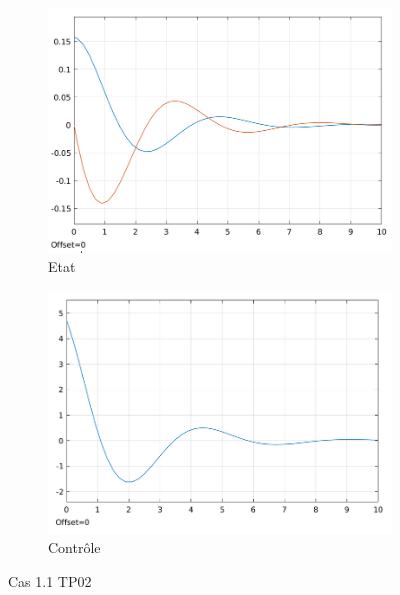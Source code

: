 \documentclass[a4paper]{article}
\begin{document}
                        \begin{figure}[h!]
                                \centering
                                \begin{subfigure}[b]{0.45\textwidth}
                                        \includegraphics[width=\textwidth]{images/courbe_cas_1_1_TP02.png}
                                        \caption{Etat}
                                        \label{fig_cas_1.1_TP02_etats}
                                \end{subfigure}
                                \hspace{30pt}
                                \begin{subfigure}[b]{0.45\textwidth}
                                        \includegraphics[width=\textwidth]{images/controle_cas_1_1_TP02.png}
                                        \caption{Contrôle}
                                        \label{fig_cas_1.1_TP02_controle}
                                \end{subfigure}
                                \caption{Cas 1.1 TP02}
                                \label{fig_cas_1.1_TP02}
                        \end{figure}
\end{document}
